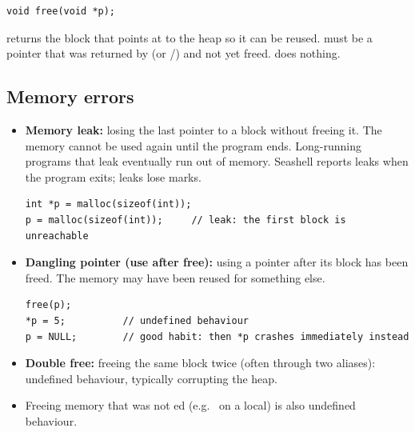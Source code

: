 \begin{lstlisting}[style=c]
void free(void *p);
\end{lstlisting}
 returns the block that  points at to the heap so it can be reused.
 must be a pointer that was returned by  (or /)
and not yet freed.  does nothing.

\subsection{Memory errors}

\begin{itemize}
  \item \textbf{Memory leak:} losing the last pointer to a block without freeing it. The memory
    cannot be used again until the program ends. Long-running programs that leak eventually run
    out of memory. Seashell reports leaks when the program exits; leaks lose marks.
\begin{lstlisting}[style=c]
int *p = malloc(sizeof(int));
p = malloc(sizeof(int));     // leak: the first block is unreachable
\end{lstlisting}
\begin{center}
\end{center}

  \item \textbf{Dangling pointer (use after free):} using a pointer after its block has been
    freed. The memory may have been reused for something else.
\begin{lstlisting}[style=c]
free(p);
*p = 5;          // undefined behaviour
p = NULL;        // good habit: then *p crashes immediately instead
\end{lstlisting}
  \item \textbf{Double free:} freeing the same block twice (often through two aliases): undefined
    behaviour, typically corrupting the heap.
  \item Freeing memory that was not ed (e.g.\  on a local) is also
    undefined behaviour.
\end{itemize}

